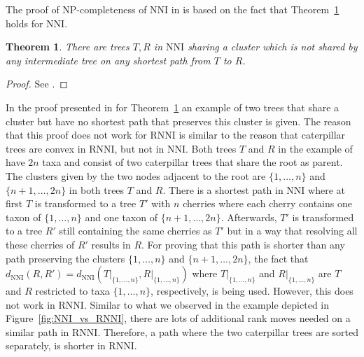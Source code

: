 \documentclass{amsart}
\newcommand{\nni}{\mathrm{NNI}}
\newcommand{\rnni}{\mathrm{RNNI}}
\newtheorem{theorem}[definition]{Theorem}
\begin{document}
The proof of NP-completeness of $\nni$ in \autocite{Dasgupta2000-xa} is based on the fact that Theorem~\ref{thm:split_nni} holds for $\nni$.

\begin{theorem}
	There are trees $T,R$ in $\nni$ sharing a cluster which is not shared by any intermediate tree on any shortest path from $T$ to $R$.
	\label{thm:split_nni}
\end{theorem}

\begin{proof}
	See \autocite{Li1996-zw}.
\end{proof}

In the proof presented in \autocite{Li1996-zw} for Theorem~\ref{thm:split_nni} an example of two trees that share a cluster but have no shortest path that preserves this cluster is given.
The reason that this proof does not work for $\rnni$ is similar to the reason that caterpillar trees are convex in $\rnni$, but not in $\nni$.
Both trees $T$ and $R$ in the example of \autocite{Li1996-zw} have $2n$ taxa and consist of two caterpillar trees that share the root as parent.
The clusters given by the two nodes adjacent to the root are $\{1, \ldots, n\}$ and $\{n+1, \ldots, 2n\}$ in both trees $T$ and $R$.
There is a shortest path in $\nni$ where at first $T$ is transformed to a tree $T'$ with $n$ cherries where each cherry contains one taxon of $\{1, \ldots, n\}$ and one taxon of $\{n+1, \ldots, 2n\}$.
Afterwards, $T'$ is transformed to a tree $R'$ still containing the same cherries as $T'$ but in a way that resolving all these cherries of $R'$ results in $R$.
For proving that this path is shorter than any path preserving the clusters $\{1, \ldots, n\}$ and $\{n+1, \ldots, 2n\}$, the fact that $d_{\nni}(R,R') = d_{\nni}(T{\big|}_{\{1, \ldots, n\}}, R{\big|}_{\{1, \ldots, n\}})$ where $T{\big|}_{\{1, \ldots, n\}}$ and $R{\big|}_{\{1, \ldots, n\}}$ are $T$ and $R$ restricted to taxa $\{1,\ldots,n\}$, respectively, is being used.
However, this does not work in $\rnni$.
Similar to what we observed in the example depicted in Figure~\ref{fig:NNI_vs_RNNI}, there are lots of additional rank moves needed on a similar path in $\rnni$.
Therefore, a path where the two caterpillar trees are sorted separately, is shorter in $\rnni$.
\end{document}

